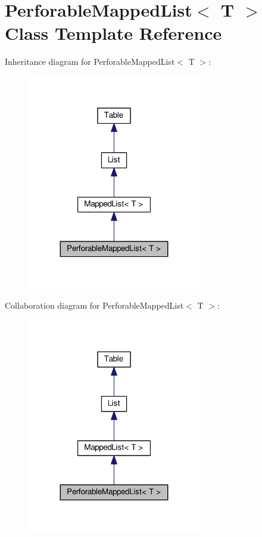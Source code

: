\hypertarget{classPerforableMappedList}{}\section{Perforable\+Mapped\+List$<$ T $>$ Class Template Reference}
\label{classPerforableMappedList}


Inheritance diagram for Perforable\+Mapped\+List$<$ T $>$\+:
\nopagebreak
\begin{figure}[H]
\begin{center}
\leavevmode
\includegraphics[width=215pt]{classPerforableMappedList__inherit__graph}
\end{center}
\end{figure}


Collaboration diagram for Perforable\+Mapped\+List$<$ T $>$\+:
\nopagebreak
\begin{figure}[H]
\begin{center}
\leavevmode
\includegraphics[width=215pt]{classPerforableMappedList__coll__graph}
\end{center}
\end{figure}
